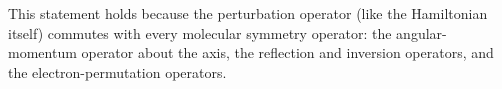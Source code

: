 This statement holds because the perturbation operator (like the Hamiltonian itself) commutes with every molecular symmetry operator: the angular-momentum operator about the axis, the reflection and inversion operators, and the electron-permutation operators.
